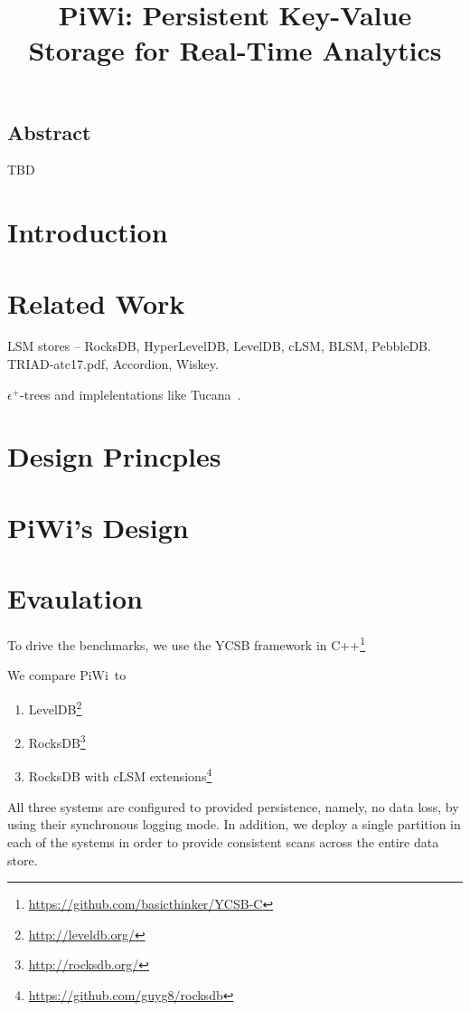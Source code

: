 \documentclass[letterpaper,twocolumn,10pt]{article}
\date{}
\newcommand{\sys}{PiWi}
\begin{document}
\title{\Large \bf \sys: Persistent Key-Value Storage for Real-Time Analytics} 
\author{}
\maketitle

\subsection*{Abstract}

TBD


\section{Introduction}


\section{Related Work}
\label{sec:related}

LSM stores -- RocksDB, HyperLevelDB, LevelDB, cLSM, BLSM, PebbleDB.
TRIAD-atc17.pdf, 
Accordion, 
Wiskey.

$\epsilon^+$-trees and implelentations like Tucana~\cite{tucana}.


\section{Design Princples}
\label{sec:principles}


\section{\sys's Design}
\label{sec:design}



\section{Evaulation}
\label{sec:eval}

To drive the benchmarks, we use the 
YCSB framework in C++\footnote{\url{https://github.com/basicthinker/YCSB-C}}  

We compare \sys\ to 
\begin{enumerate}
\item
LevelDB\footnote{\url{http://leveldb.org/}}
\item
RocksDB\footnote{\url{http://rocksdb.org/}}
\item
RocksDB with cLSM extensions\footnote{\url{https://github.com/guyg8/rocksdb}}
\end{enumerate}
All three systems are configured to provided persistence, namely, no data loss, by using their synchronous logging mode.
In addition, we deploy a single partition in each of the systems in order to provide consistent scans across the entire data store.
\end{document}
